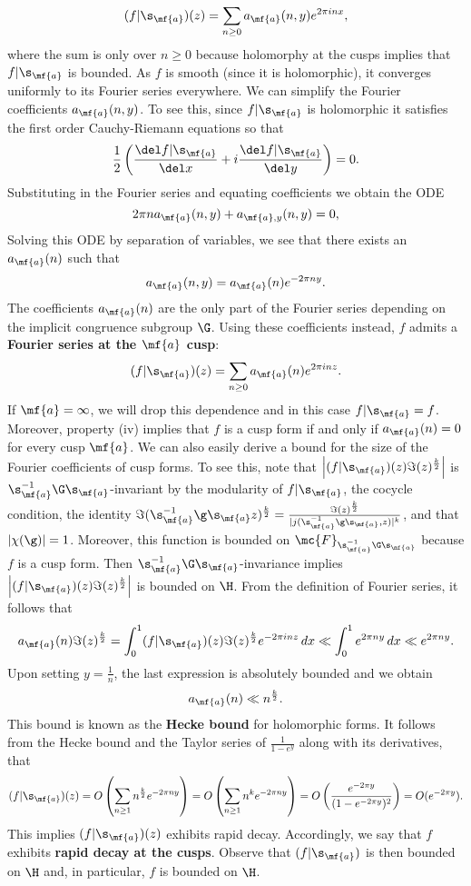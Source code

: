     \[
      (f|\s_{\mf{a}})(z) = \sum_{n \ge 0}a_{\mf{a}}(n,y)e^{2\pi inx},
    \]
    where the sum is only over $n \ge 0$ because holomorphy at the cusps implies that $f|\s_{\mf{a}}$ is bounded. As $f$ is smooth (since it is holomorphic), it converges uniformly to its Fourier series everywhere. We can simplify the Fourier coefficients $a_{\mf{a}}(n,y)$. To see this, since $f|\s_{\mf{a}}$ is holomorphic it satisfies the first order Cauchy-Riemann equations so that
    \[
      \frac{1}{2}\left(\frac{\del f|\s_{\mf{a}}}{\del x}+i\frac{\del f|\s_{\mf{a}}}{\del y}\right) = 0.
    \]
    Substituting in the Fourier series and equating coefficients we obtain the ODE
    \[
      2\pi na_{\mf{a}}(n,y)+a_{\mf{a},y}(n,y) = 0,
    \]
    Solving this ODE by separation of variables, we see that there exists an $a_{\mf{a}}(n)$ such that
    \[
      a_{\mf{a}}(n,y) = a_{\mf{a}}(n)e^{-2\pi ny}.
    \]
    The coefficients $a_{\mf{a}}(n)$ are the only part of the Fourier series depending on the implicit congruence subgroup $\G$. Using these coefficients instead, $f$ admits a \textbf{Fourier series at the $\mf{a}$ cusp}:
    \[
      (f|\s_{\mf{a}})(z) = \sum_{n \ge 0}a_{\mf{a}}(n)e^{2\pi inz}.
    \]
    If $\mf{a} = \infty$, we will drop this dependence and in this case $f|\s_{\mf{a}} = f$. Moreover, property (iv) implies that $f$ is a cusp form if and only if $a_{\mf{a}}(n) = 0$ for every cusp $\mf{a}$. We can also easily derive a bound for the size of the Fourier coefficients of cusp forms. To see this, note that $\left|(f|\s_{\mf{a}})(z)\Im(z)^{\frac{k}{2}}\right|$ is $\s_{\mf{a}}^{-1}\G\s_{\mf{a}}$-invariant by the modularity of $f|\s_{\mf{a}}$, the cocycle condition, the identity $\Im(\s_{\mf{a}}^{-1}\g\s_{\mf{a}}z)^{\frac{k}{2}} = \frac{\Im(z)^{\frac{k}{2}}}{|j(\s_{\mf{a}}^{-1}\g\s_{\mf{a}},z)|^{k}}$, and that $|\chi(\g)| = 1$. Moreover, this function is bounded on $\mc{F}_{\s_{\mf{a}}^{-1}\G\s_{\mf{a}}}$ because $f$ is a cusp form. Then $\s_{\mf{a}}^{-1}\G\s_{\mf{a}}$-invariance implies $\left|(f|\s_{\mf{a}})(z)\Im(z)^{\frac{k}{2}}\right|$ is bounded on $\H$. From the definition of Fourier series, it follows that
    \[
      a_{\mf{a}}(n)\Im(z)^{\frac{k}{2}} = \int_{0}^{1}(f|\s_{\mf{a}})(z)\Im(z)^{\frac{k}{2}}e^{-2\pi inz}\,dx \ll \int_{0}^{1}e^{2\pi ny}\,dx \ll e^{2\pi ny}.
    \]
    Upon setting $y = \frac{1}{n}$, the last expression is absolutely bounded and we obtain
    \[
      a_{\mf{a}}(n) \ll n^{\frac{k}{2}}.
    \]
    This bound is known as the \textbf{Hecke bound} for holomorphic forms. It follows from the Hecke bound and the Taylor series of $\frac{1}{1-e^{y}}$ along with its derivatives, that
    \[
      (f|\s_{\mf{a}})(z) = O\left(\sum_{n \ge 1}n^{\frac{k}{2}}e^{-2\pi ny}\right) = O\left(\sum_{n \ge 1}n^{k}e^{-2\pi ny}\right) = O\left(\frac{e^{-2\pi y}}{(1-e^{-2\pi y})^{2}}\right) = O(e^{-2\pi y}).
    \]
    This implies $(f|\s_{\mf{a}})(z)$ exhibits rapid decay. Accordingly, we say that $f$ exhibits \textbf{rapid decay at the cusps}. Observe that $(f|\s_{\mf{a}})$ is then bounded on $\H$ and, in particular, $f$ is bounded on $\H$.
